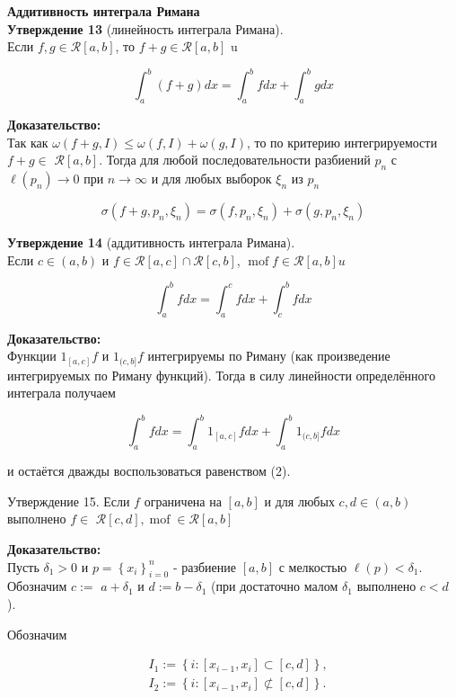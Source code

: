 \documentclass[a4paper,12pt]{article} %
\begin{document}
	\textbf{Аддитивность интеграла Римана}\\
	\textbf{Утверждение 13} (линейность интеграла Римана).\\ Если $f, g \in \mathcal{R}[a, b]$, то $f+g \in \mathcal{R}[a, b]$ u
	
	$$
	\int_{a}^{b}(f+g) d x=\int_{a}^{b} f d x+\int_{a}^{b} g d x
	$$
	
	\textbf{Доказательство:\\}
	Так как $\omega(f+g, I) \leq \omega(f, I)+\omega(g, I)$, то по критерию интегрируемости $f+g \in$ $\mathcal{R}[a, b]$. Тогда для любой последовательности разбиений $p_{n}$ с $\ell\left(p_{n}\right) \rightarrow 0$ при $n \rightarrow \infty$ и для любых выборок $\xi_{n}$ из $p_{n}$
	
	$$
	\sigma\left(f+g, p_{n}, \xi_{n}\right)=\sigma\left(f, p_{n}, \xi_{n}\right)+\sigma\left(g, p_{n}, \xi_{n}\right)
	$$
	
	\textbf{Утверждение 14} (аддитивность интеграла Римана).\\ Если $c \in(a, b)$ и $f \in \mathcal{R}[a, c] \cap \mathcal{R}[c, b]$, $\operatorname{mof} f \in \mathcal{R}[a, b] u$
	
	$$
	\int_{a}^{b} f d x=\int_{a}^{c} f d x+\int_{c}^{b} f d x
	$$
	
	\textbf{Доказательство:\\}
	Функции $1_{[a, c]} f$ и $1_{(c, b]} f$ интегрируемы по Риману (как произведение интегрируемых по Риману функций). Тогда в силу линейности определённого интеграла получаем
	
	$$
	\int_{a}^{b} f d x=\int_{a}^{b} 1_{[a, c]} f d x+\int_{a}^{b} 1_{(c, b]} f d x
	$$
	
	и остаётся дважды воспользоваться равенством (2).
	
	Утверждение 15. Если $f$ ограничена на $[a, b]$ и для любых $c, d \in(a, b)$ выполнено $f \in$ $\mathcal{R}[c, d], \operatorname{mof} \in \mathcal{R}[a, b]$
	
	\textbf{Доказательство:\\}
	Пусть $\delta_{1}>0$ и $p=\left\{x_{i}\right\}_{i=0}^{n}$ - разбиение $[a, b]$ с мелкостью $\ell(p)<\delta_{1}$. Обозначим $c:=$ $a+\delta_{1}$ и $d:=b-\delta_{1}$ (при достаточно малом $\delta_{1}$ выполнено $c<d$ ).
	
	Обозначим
	
	$$
	\begin{aligned}
	& I_{1}:=\left\{i:\left[x_{i-1}, x_{i}\right] \subset[c, d]\right\}, \\
	& I_{2}:=\left\{i:\left[x_{i-1}, x_{i}\right] \not \subset[c, d]\right\} .
	\end{aligned}
	$$
	
\end{document}
